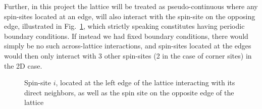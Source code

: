 \documentclass[10pt,showpacs,preprintnumbers,amsmath,amssymb,nofootinbib,aps,prl,twocolumn,groupedaddress,superscriptaddress,showkeys]{revtex4-1}
\begin{document}
    Further, in this project the lattice will be treated as pseudo-continuous where any spin-sites located at an edge, will also interact with the spin-site on the opposing edge, illustrated in Fig.~\ref{fig:ising_periodic bounds}, which strictly speaking constitutes having periodic boundary conditions. If instead we had fixed boundary conditions, there would simply be no such across-lattice interactions, and spin-sites located at the edges would then only interact with 3 other spin-sites (2 in the case of corner sites) in the 2D case.
      \begin{figure}[H]
      \centering
      \caption{Spin-site $i$, located at the left edge of the lattice interacting with its direct neighbors, as well as the spin site on the opposite edge of the lattice
      \label{fig:ising_periodic bounds}}
    \end{figure}
\end{document}
